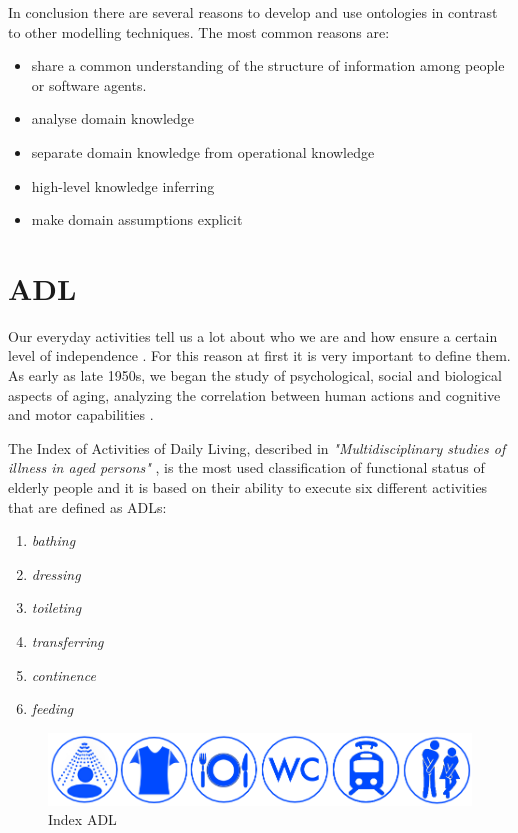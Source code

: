\documentclass{thesisreport}
\begin{document}
In conclusion there are several reasons to develop and use ontologies in contrast to other modelling techniques. The most common reasons are:
\begin{itemize}
    \item share a common understanding of the structure of information among people or software agents.
    \item analyse domain knowledge
    \item separate domain knowledge from operational knowledge
    \item high-level knowledge inferring
    \item make domain assumptions explicit
\end{itemize}


\section{ADL}
Our everyday activities tell us a lot about who we are and how ensure a certain level of independence \cite{buoncompagni2017towards}. For this reason at first it is very important to define them. As early as late 1950s, we began the study of psychological, social and biological aspects of aging, analyzing the correlation between human actions and cognitive and motor capabilities \cite{buoncompagni2017towards}. 

The Index of Activities of Daily Living, described in \textit{"Multidisciplinary studies of illness in aged persons"} \cite{Multidisciplinary},  is the most used classification of functional status of elderly people and it is based on their ability to execute six different activities that are defined as ADLs:
\begin{enumerate}
    \item \textit{bathing}
    \item \textit{dressing}
    \item \textit{toileting}
    \item \textit{transferring}
    \item \textit{continence}
    \item \textit{feeding}
\end{enumerate}

\begin{figure}[H]
	\centering
	\includegraphics[width=17cm]{Thesis/data/IndexADL.png}
	\caption{Index ADL}
	\label{fig:indexADL}
\end{figure}
\end{document}
